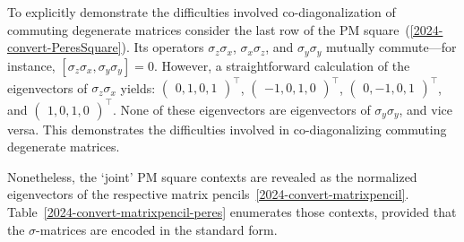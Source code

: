 \documentclass[
  twocolumn,
 showpacs,
 showkeys,
 preprintnumbers,
 amsmath,amssymb,
 aps,
 prl,
  longbibliography,
 floatfix,
 ]{revtex4-2}
\newcommand\myotimes{ }
\begin{document}
To explicitly demonstrate the difficulties involved co-diagonalization of commuting degenerate matrices
consider the last row of  the PM square~(\ref{2024-convert-PeresSquare}).
Its operators
$\sigma_z  \myotimes   \sigma_x$, $\sigma_x  \myotimes   \sigma_z$, and $\sigma_y  \myotimes   \sigma_y $ mutually
commute---for instance, $[\sigma_z  \myotimes   \sigma_x,\sigma_y  \myotimes   \sigma_y]=0$.
However, a straightforward calculation of the eigenvectors of $\sigma_z \myotimes  \sigma_x$ yields:
$\begin{pmatrix}
{0, 1, 0, 1}
\end{pmatrix}^\intercal $,
$\begin{pmatrix}
{-1, 0, 1, 0}
\end{pmatrix}^\intercal $,
$\begin{pmatrix}
{0, -1, 0, 1}
\end{pmatrix}^\intercal $, and
$\begin{pmatrix}
{1, 0, 1, 0}
\end{pmatrix}^\intercal $.
None of these eigenvectors are eigenvectors of $\sigma_y \myotimes  \sigma_y$, and vice versa.
This demonstrates the difficulties involved in co-diagonalizing  commuting degenerate matrices.

Nonetheless, the `joint' PM square contexts are revealed as the normalized eigenvectors of the respective matrix pencils~\eqref{2024-convert-matrixpencil}.
Table~\ref{2024-convert-matrixpencil-peres} enumerates those contexts,
provided that the $\sigma$-matrices are encoded in the standard form.
\end{document}
